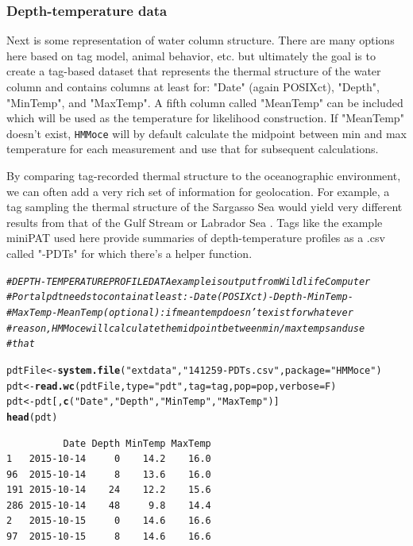 \documentclass{article}\usepackage[]{graphicx}\usepackage[]{color}
\makeatletter
\newcommand{\hlstr}[1]{\textcolor[rgb]{0.192,0.494,0.8}{#1}}%
\newcommand{\hlcom}[1]{\textcolor[rgb]{0.678,0.584,0.686}{\textit{#1}}}%
\newcommand{\hlstd}[1]{\textcolor[rgb]{0.345,0.345,0.345}{#1}}%
\newcommand{\hlkwb}[1]{\textcolor[rgb]{0.69,0.353,0.396}{#1}}%
\newcommand{\hlkwc}[1]{\textcolor[rgb]{0.333,0.667,0.333}{#1}}%
\newcommand{\hlkwd}[1]{\textcolor[rgb]{0.737,0.353,0.396}{\textbf{#1}}}%
\newenvironment{kframe}{%
 \def\at@end@of@kframe{}%
 \ifinner\ifhmode%
  \def\at@end@of@kframe{\end{minipage}}%
  \begin{minipage}{\columnwidth}%
 \fi\fi%
 \def\FrameCommand##1{\hskip\@totalleftmargin \hskip-\fboxsep
 \colorbox{shadecolor}{##1}\hskip-\fboxsep
     \hskip-\linewidth \hskip-\@totalleftmargin \hskip\columnwidth}%
 \MakeFramed {\advance\hsize-\width
   \@totalleftmargin\z@ \linewidth\hsize
   \@setminipage}}%
 {\par\unskip\endMakeFramed%
 \at@end@of@kframe}
\newenvironment{knitrout}{}{} %
\newcommand{\eg}{\textit{e.g.} }
\makeatother
\begin{document}
\subsubsection{Depth-temperature data}

Next is some representation of water column structure. There are many options here based on tag model, animal behavior, etc. but ultimately the goal is to create a tag-based dataset that represents the thermal structure of the water column and contains columns at least for: "Date" (again POSIXct), "Depth", "MinTemp", and "MaxTemp". A fifth column called "MeanTemp" can be included which will be used as the temperature for likelihood construction. If "MeanTemp" doesn't exist, \texttt{HMMoce} will by default calculate the midpoint between min and max temperature for each measurement and use that for subsequent calculations.

By comparing tag-recorded thermal structure to the oceanographic environment, we can often add a very rich set of information for geolocation. For example, a tag sampling the thermal structure of the Sargasso Sea would yield very different results from that of the Gulf Stream or Labrador Sea \citep[\eg basking sharks][]{Braun2018b}. Tags like the example miniPAT used here provide summaries of depth-temperature profiles as a .csv called "-PDTs" for which there's a helper function.

\begin{knitrout}\small
{}\color{fgcolor}\begin{kframe}
\begin{alltt}
\hlcom{# DEPTH-TEMPERATURE PROFILE DATA example is output from Wildlife Computer}
\hlcom{# Portal pdt needs to contain at least: - Date (POSIXct) - Depth - MinTemp -}
\hlcom{# MaxTemp - MeanTemp (optional): if meantemp doesn't exist for whatever}
\hlcom{# reason, HMMoce will calculate the midpoint between min/max temps and use}
\hlcom{# that}

\hlstd{pdtFile} \hlkwb{<-} \hlkwd{system.file}\hlstd{(}\hlstr{"extdata"}\hlstd{,} \hlstr{"141259-PDTs.csv"}\hlstd{,} \hlkwc{package} \hlstd{=} \hlstr{"HMMoce"}\hlstd{)}
\hlstd{pdt} \hlkwb{<-} \hlkwd{read.wc}\hlstd{(pdtFile,} \hlkwc{type} \hlstd{=} \hlstr{"pdt"}\hlstd{,} \hlkwc{tag} \hlstd{= tag,} \hlkwc{pop} \hlstd{= pop,} \hlkwc{verbose} \hlstd{= F)}
\hlstd{pdt} \hlkwb{<-} \hlstd{pdt[,} \hlkwd{c}\hlstd{(}\hlstr{"Date"}\hlstd{,} \hlstr{"Depth"}\hlstd{,} \hlstr{"MinTemp"}\hlstd{,} \hlstr{"MaxTemp"}\hlstd{)]}
\hlkwd{head}\hlstd{(pdt)}
\end{alltt}
\begin{verbatim}
          Date Depth MinTemp MaxTemp
1   2015-10-14     0    14.2    16.0
96  2015-10-14     8    13.6    16.0
191 2015-10-14    24    12.2    15.6
286 2015-10-14    48     9.8    14.4
2   2015-10-15     0    14.6    16.6
97  2015-10-15     8    14.6    16.6
\end{verbatim}
\end{kframe}
\end{knitrout}
\end{document}
